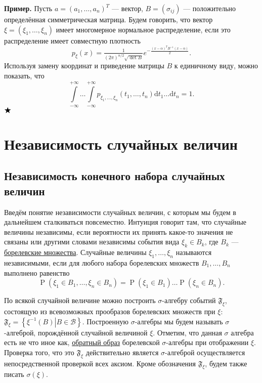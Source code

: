 \documentclass[12pt]{article}
\numberwithin{theorem}{section}
\theoremstyle{definition}
\newenvironment{example}{\indent \textbf{Пример.}}{$ \hfill \bigstar $}
\newcommand{\defin}[2]{\hypertarget{#2}{{\color{red} #1}}}
\newcommand{\calB}{\mathcal{B}}
\newcommand{\prob}{\operatorname{P}}
\newcommand{\events}{\mathfrak{F}}
\newcommand{\diff}{\mathrm{d}}
\newcommand{\defineset}[2]{\left\{
	\left.
	#1
	\right\vert
	#2
	\right\}}
\begin{document}
	\begin{example}
		Пусть $ a = (a_1,\ldots, a_n)^T $ --- вектор, $ B = (\sigma_{ij}) $ --- положительно определённая симметрическая матрица. Будем говорить, что вектор $ \xi = (\xi_1, \ldots, \xi_n) $ имеет многомерное нормальное распределение,
		если это распределение имеет совместную плотность
		$$ p_{\xi}(x) = \tfrac{1}{(2\pi)^{n / 2}\sqrt{\det B}}e^{-\tfrac{(x - \alpha)^TB^{-1}(x - \alpha)}{2}}. $$
		Используя замену координат и приведение матрицы $ B $ к единичному виду, можно показать,
		что
		$$ \int\limits_{-\infty}^{+\infty} \ldots \int\limits_{-\infty}^{+\infty} 
		p_{\xi_1,\ldots,\xi_n}(t_1,\ldots,t_n)\diff t_1 \ldots \diff t_n = 1. $$
	\end{example}
	
	\section{Независимость случайных величин}
	
	\subsection{Независимость конечного набора случайных величин}
	
	Введём понятие независимости случайных величин, с которым мы будем в дальнейшем сталкиваться повсеместно.
	Интуиция говорит там, что случайные величины независимы, если вероятности их принять какое-то значения
	не связаны или другими словами независимы события вида $ \xi_k \in B_k $, 
	где $ B_k $ --- \hyperlink{borel-sets}{борелевские множества}.
	Случайные величины $ \xi_1, \ldots, \xi_n $ называются \defin{независимыми}{independent-random-variables},
	если для любого набора борелевских множеств $ B_1, \ldots, B_n $ выполнено равенство
	$$ \prob(\xi_1 \in B_1, \ldots, \xi_n \in B_n) = \prob(\xi_1 \in B_1)\ldots\prob(\xi_n \in B_n). $$
	
	По всякой случайной величине можно построить $ \sigma $-алгебру событий $ \events_\xi $,
	состоящую из всевозможных прообразов борелевских множеств при $ \xi $:
	$ \events_\xi = \defineset{\xi^{-1}(B)}{B \in \calB} $.
	Построенную $ \sigma $-алгебры мы будем называть \defin{$ \sigma $-алгеброй, порождённой случайной величиной $ \xi $}
	{random variable sigma algebra}. Отметим, что данная $ \sigma $ алгебра есть не что иное как,
	\hyperlink{inverse-image-of-sigma-algebra}{обратный образ} борелевской $ \sigma $-алгебры при отображении $ \xi $.
	Проверка того, что это $ \events_{\xi} $ действительно является $ \sigma $-алгеброй 
	осуществляется непосредственной проверкой всех аксиом.
	Кроме обозначения $ \events_\xi $,	 будем также писать $ \sigma(\xi) $.
	
\end{document}
